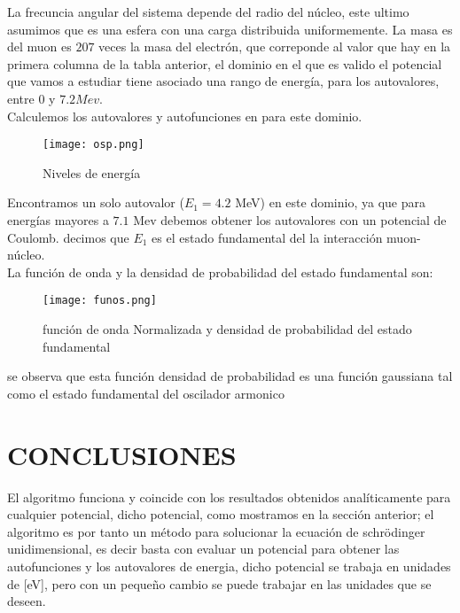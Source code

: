\documentclass[9pt,twocolumn,twoside]{osajnl}
\begin{document}
La frecuncia angular del sistema depende del radio del núcleo, este ultimo asumimos que es una esfera con una carga distribuida uniformemente. La masa es del muon es $207$ veces la masa del electrón, que correponde al valor que hay en la primera columna de la tabla anterior, el dominio en el que es valido el potencial que vamos a estudiar tiene asociado una rango de energía, para los autovalores, entre $0$ y $7.2 Mev$.\\
Calculemos los autovalores y autofunciones en para este dominio.
\begin{figure}[H]
    \centering
    \texttt{[image: osp.png]}
    \caption{Niveles de energía}
    \label{fig:my_label}
\end{figure}
Encontramos un solo autovalor ($E_1=4.2$ MeV) en este dominio, ya que para energías mayores a $7.1$ Mev debemos obtener los autovalores con un potencial de Coulomb. decimos que $E_1$ es el estado fundamental del la interacción muon-núcleo.\\
La función de onda y la densidad de probabilidad del estado fundamental son:
\begin{figure}[H]
    \centering
    \texttt{[image: funos.png]}
    \caption{función de onda Normalizada y densidad de probabilidad del estado fundamental}
    \label{fig:my_label}
\end{figure}
se observa que esta función densidad de probabilidad  es una función gaussiana tal como el estado fundamental del oscilador armonico

\section{CONCLUSIONES}

El algoritmo funciona y  coincide con los resultados obtenidos analíticamente para cualquier potencial, dicho potencial, como mostramos en la sección anterior; el algoritmo es por tanto un método para solucionar la ecuación de schrödinger unidimensional, es decir basta con evaluar un potencial para obtener las autofunciones y los autovalores de energia, dicho potencial se trabaja en unidades de [eV], pero con un pequeño cambio se puede trabajar en las unidades que se deseen.
\end{document}
